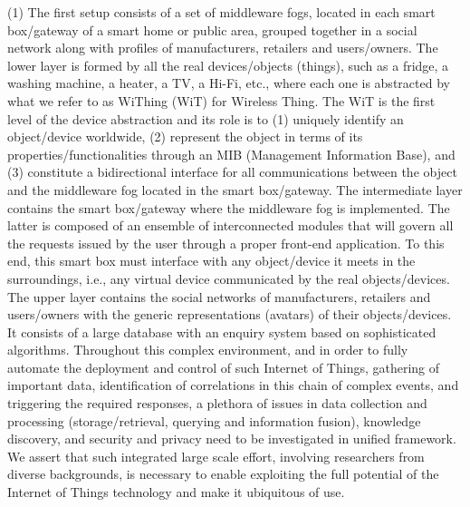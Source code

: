 (1)  The first setup consists of a set of middleware fogs, located in each smart box/gateway of a smart home or public area, grouped together in a social network along with profiles of manufacturers, retailers and users/owners. The lower layer is formed by all the real devices/objects (things), such as a fridge, a washing machine, a heater, a TV, a Hi-Fi, etc., where each one is abstracted by what we refer to as WiThing (WiT) for Wireless Thing. The WiT is the first level of the device abstraction and its role is to (1) uniquely identify an object/device worldwide, (2) represent the object in terms of its properties/functionalities through an MIB (Management Information Base), and (3) constitute a bidirectional interface for all communications between the object and the middleware fog located in the smart box/gateway. The intermediate layer contains the smart box/gateway where the middleware fog is implemented. The latter is composed of an ensemble of interconnected modules that will govern all the requests issued by the user through a proper front-end application. To this end, this smart box must interface with any object/device it meets in the surroundings, i.e., any virtual device communicated by the real objects/devices. The upper layer contains the social networks of manufacturers, retailers and users/owners with the generic representations (avatars) of their objects/devices. It consists of a large database with an enquiry system based on sophisticated algorithms.
Throughout this complex environment, and in order to fully automate the deployment and control of such Internet of Things, gathering of important data, identification of correlations in this chain of complex events, and triggering the required responses, a plethora of issues in data collection and processing (storage/retrieval, querying and information fusion), knowledge discovery, and security and privacy need to be investigated in unified framework. We assert that  such integrated large scale effort, involving researchers from diverse backgrounds, is necessary to  enable exploiting the full potential of the Internet of Things technology  and make it ubiquitous of use.

